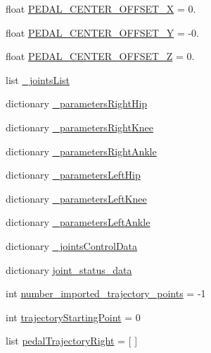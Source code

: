 \begin{DoxyCompactItemize}
\item 
float \mbox{\hyperlink{namespacepedal__simulation_a40f1995899f7c5069338d60b7dc76daa}{P\+E\+D\+A\+L\+\_\+\+C\+E\+N\+T\+E\+R\+\_\+\+O\+F\+F\+S\+E\+T\+\_\+X}} = 0.
\item 
float \mbox{\hyperlink{namespacepedal__simulation_a4e96e9821a7a10a61481e19fcf44fb74}{P\+E\+D\+A\+L\+\_\+\+C\+E\+N\+T\+E\+R\+\_\+\+O\+F\+F\+S\+E\+T\+\_\+Y}} = -\/0.
\item 
float \mbox{\hyperlink{namespacepedal__simulation_a5269d294fa9d6498c7e20da737865d51}{P\+E\+D\+A\+L\+\_\+\+C\+E\+N\+T\+E\+R\+\_\+\+O\+F\+F\+S\+E\+T\+\_\+Z}} = 0.
\item 
list \mbox{\hyperlink{namespacepedal__simulation_a90eaa4eedceada2483c18daf6837b72c}{\+\_\+joints\+List}}
\item 
dictionary \mbox{\hyperlink{namespacepedal__simulation_a5e2a6f340430b2f768cccd2ee8799462}{\+\_\+parameters\+Right\+Hip}}
\item 
dictionary \mbox{\hyperlink{namespacepedal__simulation_aa82056fb0a0641314c28a1e8a73325d5}{\+\_\+parameters\+Right\+Knee}}
\item 
dictionary \mbox{\hyperlink{namespacepedal__simulation_a60241d4aea32187367516779d5e0e72a}{\+\_\+parameters\+Right\+Ankle}}
\item 
dictionary \mbox{\hyperlink{namespacepedal__simulation_a5708d5a0da5e620e11e2b72890447d25}{\+\_\+parameters\+Left\+Hip}}
\item 
dictionary \mbox{\hyperlink{namespacepedal__simulation_a0a86addbabf6534ae56e5c2967886a67}{\+\_\+parameters\+Left\+Knee}}
\item 
dictionary \mbox{\hyperlink{namespacepedal__simulation_a6058204fc868715a30e0368a9c4ebc57}{\+\_\+parameters\+Left\+Ankle}}
\item 
dictionary \mbox{\hyperlink{namespacepedal__simulation_a85a4d895189d151657b0867797bf1a09}{\+\_\+joints\+Control\+Data}}
\item 
dictionary \mbox{\hyperlink{namespacepedal__simulation_abf12f027c2a2a9020fa542574bfcd46c}{joint\+\_\+status\+\_\+data}}
\item 
int \mbox{\hyperlink{namespacepedal__simulation_a7cbda7604a84651c8d8ac347097f73ff}{number\+\_\+imported\+\_\+trajectory\+\_\+points}} = -\/1
\item 
int \mbox{\hyperlink{namespacepedal__simulation_ad7731301036c8b6b468b20d1b5aaed21}{trajectory\+Starting\+Point}} = 0
\item 
list \mbox{\hyperlink{namespacepedal__simulation_ac6c7d66bbded17d43bfbac519fd74972}{pedal\+Trajectory\+Right}} = \mbox{[} \mbox{]}

\end{DoxyCompactItemize}
